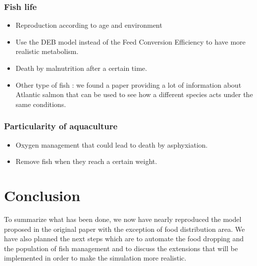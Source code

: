 \documentclass[9pt]{article}
\begin{document}
\small\subsubsection*{Fish life}
\begin{itemize}
    \item Reproduction according to age and environment
    \item Use the DEB model instead of the Feed Conversion Efficiency to have more realistic metabolism.
    \item Death by malnutrition after a certain time.
    \item Other type of fish : we found a paper providing a lot of information about Atlantic salmon \cite{handeland2008effect} that can be used to see how a different species acts under the same conditions.
\end{itemize}

\small\subsubsection*{Particularity of aquaculture}
\begin{itemize}
    \item Oxygen management that could lead to death by asphyxiation.
    \item Remove fish when they reach a certain weight.
\end{itemize}


\section{Conclusion }
To summarize what has been done, we now have nearly reproduced the model proposed in the original paper with the exception of food distribution area. We have also planned the next steps which are to automate the food dropping and the population of fish management and to discuss the extensions that will be implemented in order to make the simulation more realistic.




\end{document}
